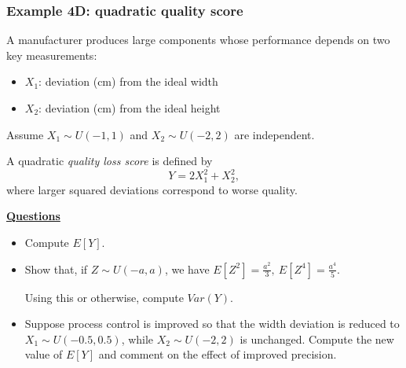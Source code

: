 \documentclass[t,8pt]{beamer}
\begin{document}

\begin{frame}
	\frametitle{Example 4D: quadratic quality score}
	A manufacturer produces large components whose performance depends on two key measurements:
	\begin{itemize}
		\item $X_1$: deviation (cm) from the ideal width
		\item $X_2$: deviation (cm) from the ideal height
	\end{itemize}
	Assume $X_1 \sim U(-1,1)$ and $X_2 \sim U(-2,2)$ are independent. \par 
	A quadratic \emph{quality loss score} is defined by
	\[
	Y = 2X_1^2 + X_2^2,
	\]
	where larger squared deviations correspond to worse quality. \par 
	{\bf\underline{Questions}}
	\begin{itemize}
		\item[(a)] Compute $E[Y]$. 
		\item[(b)] Show that, if $Z\sim U(-a,a)$, we have $E[Z^2] = \frac{a^2}{3},\ E[Z^4] = \frac{a^4}{5}$. \par 
		Using this or otherwise, compute $Var(Y)$. 
		\item[(c)] Suppose process control is improved so that the width deviation is reduced to $X_1 \sim U(-0.5,0.5)$, while $X_2 \sim U(-2,2)$ is unchanged. Compute the new value of $E[Y]$ and comment on the effect of improved precision.
	\end{itemize}
\end{frame}
\end{document}

